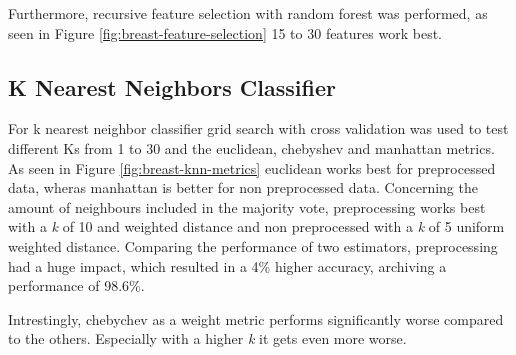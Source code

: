 

Furthermore, recursive feature selection with random forest was performed, as seen in Figure \ref{fig:breast-feature-selection} 15 to 30 features work best.


\subsection{K Nearest Neighbors Classifier}

For k nearest neighbor classifier grid search with cross validation was used to test different Ks from 1 to 30 and the euclidean, chebyshev and manhattan metrics.
As seen in Figure \ref{fig:breast-knn-metrics} euclidean works best for preprocessed data, wheras manhattan is better for non preprocessed data.
Concerning the amount of neighbours included in the majority vote, preprocessing works best with a \textit{k} of 10 and weighted distance and non preprocessed with a \textit{k} of 5 uniform weighted distance.
Comparing the performance of two estimators, preprocessing had a huge impact, which resulted in a 4\% higher accuracy, archiving a performance of 98.6\%.  

Intrestingly, chebychev as a weight metric performs significantly worse compared to the others. Especially with a higher \textit{k} it gets even more worse.

